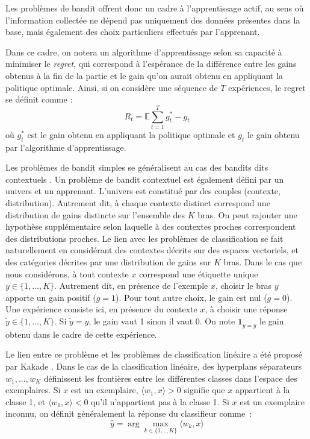 \documentclass[twocolumn]{article}
\begin{document}
Les problèmes de bandit offrent donc un cadre à l'apprentissage actif, au sens où l'information collectée ne dépend pas uniquement des données présentes dans la base, mais également des choix particuliers effectués par l'apprenant. 

Dans ce cadre, on notera un algorithme d'apprentissage selon sa capacité à minimiser le \textit{regret}, qui correspond à l'espérance de la différence entre les gains obtenus à la fin de la partie et le gain qu'on aurait obtenu en appliquant la politique optimale. 
Ainsi, si on considère une séquence de $T$ expériences, le regret se définit comme :
$$R_t = \mathbb{E} \sum_{t=1}^T g_t^* - g_t$$
où $g_t^*$ est le gain obtenu en appliquant la politique optimale et $g_t$ le gain obtenu par l'algorithme d'apprentissage.

Les problèmes de bandit simples se généralisent au cas des bandits dits contextuels \cite{XXX}. Un problème de bandit contextuel est également défini par un univers et un apprenant. L'univers est constitué par des couples (contexte, distribution). Autrement dit, à chaque contexte distinct correspond une distribution de gains distincte sur l'ensemble des $K$ bras. On peut rajouter une hypothèse supplémentaire selon laquelle à des contextes proches correspondent des distributions proches. Le lien avec les problèmes de classification se fait naturellement en considérant des contextes décrits sur des espaces vectoriels, et des catégories décrites par une distribution de gains sur $K$ bras. Dans le cas que nous considérons, à tout contexte $x$ correspond une étiquette unique $y \in \{1,...,K\}$. Autrement dit, en présence de l'exemple $x$, choisir le bras $y$ apporte un gain positif ($g=1$). Pour tout autre choix, le gain est nul ($g=0$). Une expérience consiste ici, en présence du contexte $x$, à choisir une réponse $\tilde{y} \in \{1,...,K\}$. Si $\tilde{y} = y$, le gain vaut 1 sinon il vaut 0. On note $\mathbf{1}_{\tilde{y} = y}$ le gain obtenu dans le cadre de cette expérience. 

Le lien entre ce problème et les problèmes de classification linéaire a été proposé par Kakade \cite{XXX}. Dans le cas de la classification linéaire, des hyperplans séparateurs $w_1, ..., w_K$ définissent les frontières entre les différentes classes dans l'espace des exemplaires.  
Si $x$ est un exemplaire, $\langle w_1, x \rangle > 0$ signifie que $x$ appartient à la classe 1, et $\langle w_1, x \rangle < 0$ qu'il n'appartient pas à la classe 1. Si $x$ est un exemplaire inconnu, on définit généralement la réponse du classifieur comme~:
$$\hat{y} = \arg \max_{k \in\{1,..,K\}}  \langle w_k, x \rangle$$
 
\end{document}
